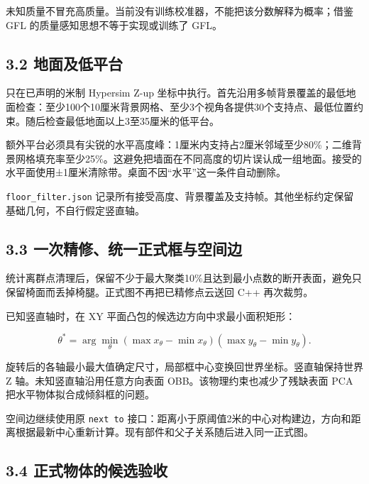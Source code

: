 \documentclass[UTF8,fontset=fandol]{ctexart}
\begin{document}
未知质量不冒充高质量。当前没有训练校准器，不能把该分数解释为概率；借鉴 GFL 的质量感知思想不等于实现或训练了 GFL。



\subsection*{3.2 地面及低平台}

只在已声明的米制 Hypersim Z-up 坐标中执行。首先沿用多帧背景覆盖的最低地面检查：至少100个10厘米背景网格、至少3个视角各提供30个支持点、最低位置约束。随后检查最低地面以上3至35厘米的低平台。



额外平台必须具有尖锐的水平高度峰：1厘米内支持占2厘米邻域至少80\%；二维背景网格填充率至少25\%。这避免把墙面在不同高度的切片误认成一组地面。接受的水平面使用±1厘米清除带。桌面不因“水平”这一条件自动删除。



\texttt{floor\_\allowbreak{}filter.\allowbreak{}json} 记录所有接受高度、背景覆盖及支持帧。其他坐标约定保留基础几何，不自行假定竖直轴。



\subsection*{3.3 一次精修、统一正式框与空间边}

统计离群点清理后，保留不少于最大聚类10\%且达到最小点数的断开表面，避免只保留椅面而丢掉椅腿。正式图不再把已精修点云送回 C++ 再次裁剪。



已知竖直轴时，在 XY 平面凸包的候选边方向中求最小面积矩形：



\[
\theta^*=\arg\min_\theta
(\max x_\theta-\min x_\theta)(\max y_\theta-\min y_\theta).
\]

旋转后的各轴最小最大值确定尺寸，局部框中心变换回世界坐标。竖直轴保持世界 Z 轴。未知竖直轴沿用任意方向表面 OBB。该物理约束也减少了残缺表面 PCA 把水平物体拟合成倾斜框的问题。



空间边继续使用原 \texttt{next to} 接口：距离小于原阈值2米的中心对构建边，方向和距离根据最新中心重新计算。现有部件和父子关系随后进入同一正式图。



\subsection*{3.4 正式物体的候选验收}
\end{document}
